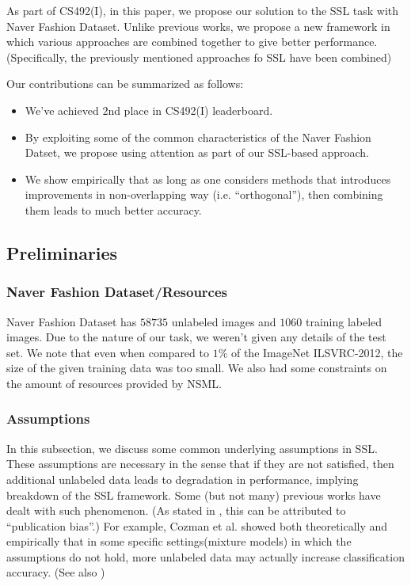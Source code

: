 \documentclass[10pt,twocolumn,letterpaper]{article}
\begin{document}
	As part of CS492(I), in this paper, we propose our solution to the SSL task with Naver Fashion Dataset.
	Unlike previous works, we propose a new framework in which various approaches are combined together to give better performance.
	(Specifically, the previously mentioned approaches fo SSL have been combined)
	
	Our contributions can be summarized as follows:
	\begin{itemize}
		\item We've achieved $2$nd place in CS492(I) leaderboard.
		
		\item By exploiting some of the common characteristics of the Naver Fashion Datset, we propose using attention as part of our SSL-based approach.
		
		\item We show empirically that as long as one considers methods that introduces improvements in non-overlapping way (i.e. \enquote{orthogonal}), then combining them leads to much better accuracy.
	\end{itemize}
	
	\subsection{Preliminaries}
	
	\subsubsection{Naver Fashion Dataset/Resources}
	Naver Fashion Dataset has $58735$ unlabeled images and $1060$ training labeled images.
	Due to the nature of our task, we weren't given any details of the test set.
	We note that even when compared to $1\%$ of the ImageNet ILSVRC-2012\cite{ILSVRC15}, the size of the given training data was too small.
	We also had some constraints on the amount of resources provided by NSML\cite{NSML}.
	
	
	\subsubsection{Assumptions}
	In this subsection, we discuss some common underlying assumptions in SSL.
	These assumptions are necessary in the sense that if they are not satisfied, then additional unlabeled data leads to degradation in performance, implying breakdown of the SSL framework.
	Some (but not many) previous works have dealt with such phenomenon. (As stated in \cite{Zhu05}, this can be attributed to \enquote{publication bias}.)
	For example, Cozman et al.\cite{CCC02} showed both theoretically and empirically that in some specific settings(mixture models) in which the assumptions do not hold, more unlabeled data may actually increase classification accuracy.
	(See also \cite{Elworthy94})
	
\end{document}
